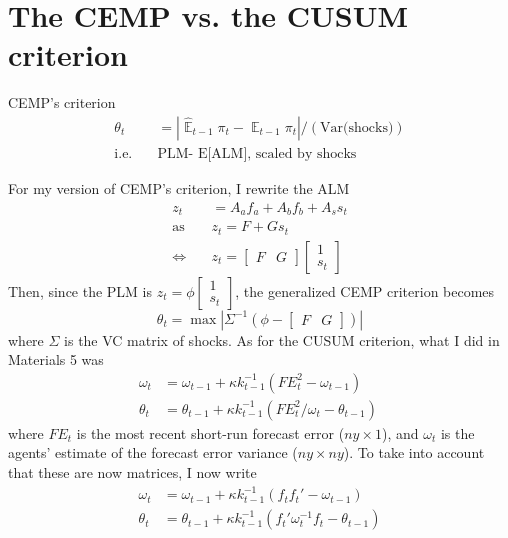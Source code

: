 \documentclass[11pt]{article}
\renewcommand{\[}{\begin{equation}}
\renewcommand{\]}{\end{equation}}
\DeclareMathOperator{\E}{\mathbb{E}}
\begin{document}
\clearpage


\newpage
\section{The CEMP vs. the CUSUM criterion}

CEMP's criterion  
\begin{align}
\theta_t & = |\hat{\E}_{t-1}\pi_t - \E_{t-1}\pi_t | / (\text{Var(shocks)}) \\
\text{i.e.} \quad &\text{PLM- E[ALM], scaled by shocks}
\end{align}

For my version of CEMP's criterion, I rewrite the ALM
\begin{align}
z_t & = A_a f_a + A_b f_b + A_s s_t \\
\text{as} \quad & z_t =  F  +Gs_t  \\
\Leftrightarrow \quad & z_t = \begin{bmatrix} F & G \end{bmatrix} \begin{bmatrix} 1 \\ s_t\end{bmatrix}
\end{align}
Then, since the PLM is $z_t = \phi  \begin{bmatrix} 1 \\ s_t\end{bmatrix}$, the generalized CEMP criterion becomes
\begin{equation}
\theta_t = \max | \Sigma^{-1} ( \phi - \begin{bmatrix} F & G \end{bmatrix}) |
\end{equation}
where $\Sigma$ is the VC matrix of shocks.
As for the CUSUM criterion, what I did in Materials 5 was
\begin{align}
 \omega_t & =  \omega_{t-1} + \kappa k_{t-1}^{-1}(FE_t^2 -\omega_{t-1})\\
\theta_t & =  \theta_{t-1} + \kappa k_{t-1}^{-1}(FE_t^2/\omega_t -\theta_{t-1})\
\end{align}
where $FE_t$ is the most recent short-run forecast error ($ny\times 1$), and $\omega_t$ is the agents' estimate of the forecast error variance ($ny \times ny$). To take into account that these are now matrices, I now write
\begin{align}
\omega_t & =  \omega_{t-1} + \kappa k_{t-1}^{-1}(f_t f_t'  -\omega_{t-1})\\
\theta_t & =  \theta_{t-1} + \kappa k_{t-1}^{-1}(f_t'\omega_t^{-1}f_t -\theta_{t-1})
\end{align}
\end{document}

